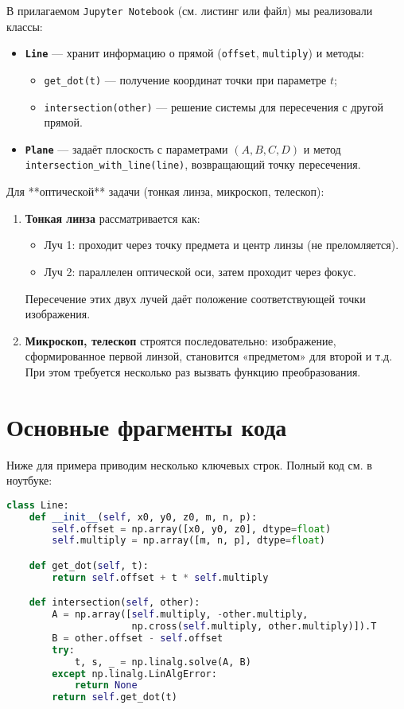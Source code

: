 \documentclass[a4paper,12pt]{article}
\begin{document}
В прилагаемом \texttt{Jupyter Notebook} (см. листинг или файл) мы реализовали классы:
\begin{itemize}
  \item \textbf{\texttt{Line}} --- хранит информацию о прямой (\texttt{offset}, \texttt{multiply}) и методы:
    \begin{itemize}
      \item \texttt{get\_dot(t)} --- получение координат точки при параметре $t$;
      \item \texttt{intersection(other)} --- решение системы для пересечения с другой прямой.
    \end{itemize}
  \item \textbf{\texttt{Plane}} --- задаёт плоскость с параметрами $(A,B,C,D)$ и метод \texttt{intersection\_with\_line(line)}, возвращающий точку пересечения.
\end{itemize}

Для **оптической** задачи (тонкая линза, микроскоп, телескоп):
\begin{enumerate}
    \item \textbf{Тонкая линза} рассматривается как:
      \begin{itemize}
       \item Луч 1: проходит через точку предмета и центр линзы (не преломляется).
       \item Луч 2: параллелен оптической оси, затем проходит через фокус.
      \end{itemize}
      Пересечение этих двух лучей даёт положение соответствующей точки изображения.
    \item \textbf{Микроскоп, телескоп} строятся последовательно: изображение, сформированное первой линзой, становится «предметом» для второй и т.д. При этом требуется несколько раз вызвать функцию преобразования.
\end{enumerate}

\section{Основные фрагменты кода}

Ниже для примера приводим несколько ключевых строк. Полный код см. в ноутбуке:

\begin{lstlisting}[language=Python, basicstyle=\small]
class Line:
    def __init__(self, x0, y0, z0, m, n, p):
        self.offset = np.array([x0, y0, z0], dtype=float)
        self.multiply = np.array([m, n, p], dtype=float)

    def get_dot(self, t):
        return self.offset + t * self.multiply

    def intersection(self, other):
        A = np.array([self.multiply, -other.multiply, 
                      np.cross(self.multiply, other.multiply)]).T
        B = other.offset - self.offset
        try:
            t, s, _ = np.linalg.solve(A, B)
        except np.linalg.LinAlgError:
            return None
        return self.get_dot(t)
\end{lstlisting}
\end{document}
